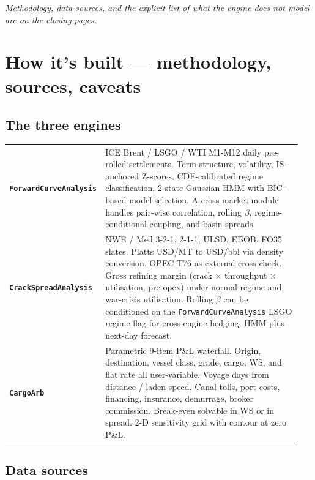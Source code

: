 \documentclass[10pt,a4paper]{article}
\begin{document}
\vspace{0.2cm}
\textit{Methodology, data sources, and the explicit list of what the engine does \emph{not} model are on the closing pages.}

\newpage

\section{How it's built --- methodology, sources, caveats}\label{sec:14}

\subsection{The three engines}

\small
\begin{tabular}{@{}p{0.23\linewidth} p{0.72\linewidth}@{}}
\toprule
\textbf{\texttt{ForwardCurveAnalysis}} & ICE Brent / LSGO / WTI M1-M12 daily pre-rolled settlements. Term structure, volatility, IS-anchored Z-scores, CDF-calibrated regime classification, 2-state Gaussian HMM with BIC-based model selection. A cross-market module handles pair-wise correlation, rolling $\beta$, regime-conditional coupling, and basin spreads. \\
\addlinespace
\textbf{\texttt{CrackSpreadAnalysis}} & NWE / Med 3-2-1, 2-1-1, ULSD, EBOB, FO35 slates. Platts USD/MT to USD/bbl via density conversion. OPEC T76 as external cross-check. Gross refining margin (crack $\times$ throughput $\times$ utilisation, pre-opex) under normal-regime and war-crisis utilisation. Rolling $\beta$ can be conditioned on the \texttt{ForwardCurveAnalysis} LSGO regime flag for cross-engine hedging. HMM plus next-day forecast. \\
\addlinespace
\textbf{\texttt{CargoArb}} & Parametric 9-item P\&L waterfall. Origin, destination, vessel class, grade, cargo, WS, and flat rate all user-variable. Voyage days from distance / laden speed. Canal tolls, port costs, financing, insurance, demurrage, broker commission. Break-even solvable in WS or in spread. 2-D sensitivity grid with contour at zero P\&L. \\
\bottomrule
\end{tabular}

\subsection{Data sources}
\end{document}
